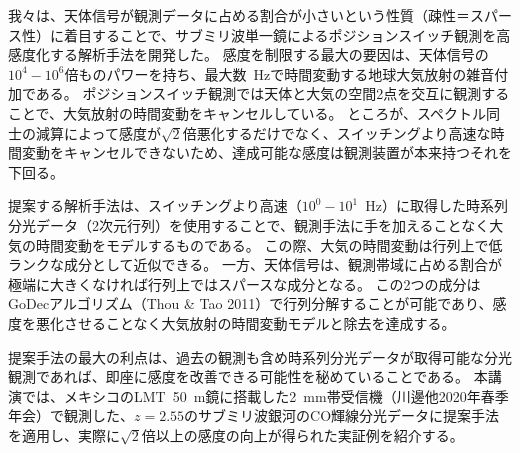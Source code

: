 \documentclass[ja]{2020b}
\begin{document}

我々は、天体信号が観測データに占める割合が小さいという性質（疎性＝スパース性）に着目することで、サブミリ波単一鏡によるポジションスイッチ観測を高感度化する解析手法を開発した。
感度を制限する最大の要因は、天体信号の$10^{4}-10^{6}$倍ものパワーを持ち、最大数~Hzで時間変動する地球大気放射の雑音付加である。
ポジションスイッチ観測では天体と大気の空間2点を交互に観測することで、大気放射の時間変動をキャンセルしている。
ところが、スペクトル同士の減算によって感度が$\sqrt{2}$倍悪化するだけでなく、スイッチングより高速な時間変動をキャンセルできないため、達成可能な感度は観測装置が本来持つそれを下回る。

提案する解析手法は、スイッチングより高速（$10^{0}-10^{1}$~Hz）に取得した時系列分光データ（2次元行列）を使用することで、観測手法に手を加えることなく大気の時間変動をモデルするものである。
この際、大気の時間変動は行列上で低ランクな成分として近似できる。
一方、天体信号は、観測帯域に占める割合が極端に大きくなければ行列上ではスパースな成分となる。
この2つの成分はGoDecアルゴリズム（Thou \& Tao 2011）で行列分解することが可能であり、感度を悪化させることなく大気放射の時間変動モデルと除去を達成する。

提案手法の最大の利点は、過去の観測も含め時系列分光データが取得可能な分光観測であれば、即座に感度を改善できる可能性を秘めていることである。
本講演では、メキシコのLMT~50~m鏡に搭載した2~mm帯受信機（川邊他2020年春季年会）で観測した、$z=2.55$のサブミリ波銀河のCO輝線分光データに提案手法を適用し、実際に$\sqrt{2}$倍以上の感度の向上が得られた実証例を紹介する。



\end{document}
